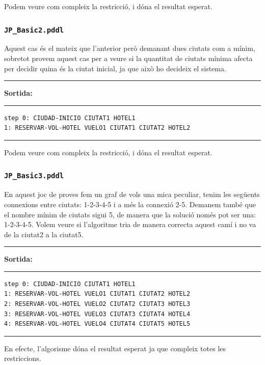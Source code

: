 \documentclass[11pt,a4paper]{article}
\begin{document}
Podem veure com compleix la restricció, i dóna el resultat esperat.

\subsubsection*{\texttt{JP\_Basic2.pddl}}

Aquest cas és el mateix que l'anterior però demanant dues ciutats com a mínim, sobretot provem aquest cas per a veure si la quantitat de ciutats mínima afecta per decidir quina és la ciutat inicial, ja que això ho decideix el sistema.

\begin{samepage}
\medskip
\noindent
\rule{0.1\textwidth}{0.5mm}
\textbf{Sortida:}
\rule{0.76\textwidth}{0.5mm}
\begin{verbatim}
step 0: CIUDAD-INICIO CIUTAT1 HOTEL1
1: RESERVAR-VOL-HOTEL VUELO1 CIUTAT1 CIUTAT2 HOTEL2
\end{verbatim}
\rule{\textwidth}{0.5mm}
\medskip
\end{samepage}

Podem veure com compleix la restricció, i dóna el resultat esperat.

\subsubsection*{\texttt{JP\_Basic3.pddl}}

En aquest joc de proves fem un graf de vols una mica peculiar, tenim les següents connexions entre ciutats: 1-2-3-4-5 i a més la connexió 2-5. Demanem també que el nombre mínim de ciutats sigui 5, de manera que la solució només pot ser una: 1-2-3-4-5. Volem veure si l'algoritme tria de manera correcta aquest camí i no va de la ciutat2 a la ciutat5.

\begin{samepage}
\medskip
\noindent
\rule{0.1\textwidth}{0.5mm}
\textbf{Sortida:}
\rule{0.76\textwidth}{0.5mm}
\begin{verbatim}
step 0: CIUDAD-INICIO CIUTAT1 HOTEL1
1: RESERVAR-VOL-HOTEL VUELO1 CIUTAT1 CIUTAT2 HOTEL2
2: RESERVAR-VOL-HOTEL VUELO2 CIUTAT2 CIUTAT3 HOTEL3
3: RESERVAR-VOL-HOTEL VUELO3 CIUTAT3 CIUTAT4 HOTEL4
4: RESERVAR-VOL-HOTEL VUELO4 CIUTAT4 CIUTAT5 HOTEL5
\end{verbatim}
\rule{\textwidth}{0.5mm}
\medskip
\end{samepage}

En efecte, l'algorisme dóna el resultat esperat ja que compleix totes les restriccions.
\end{document}
